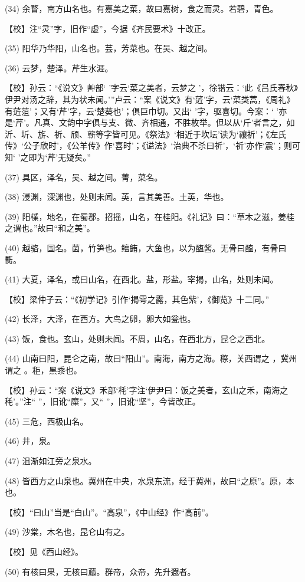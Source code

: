 \documentclass[12pt,UTF8]{ctexbook}
\begin{document}
(34) 余瞀，南方山名也。有嘉美之菜，故曰嘉树，食之而灵。若碧，青色。

【校】注“灵”字，旧作“虚”，今据《齐民要术》十改正。

(35) 阳华乃华阳，山名也。芸，芳菜也。在吴、越之间。

(36) 云梦，楚泽。芹生水涯。

【校】孙云：“《说文》艸部‘ ’字云‘菜之美者，云梦之 ’，徐锴云：‘此《吕氏春秋》伊尹对汤之辞，其为状未闻。’”卢云：“案《说文》有‘菦’字，云‘菜类蒿，《周礼》有菦菹’；又有‘芹’字，云‘楚葵也’；俱巨巾切。又出‘ ’字，驱喜切。今案：‘ ’亦是‘芹’。凡真、文韵中字俱与支、微、齐相通，不胜枚举。但以从‘斤’者言之，如沂、圻、旂、祈、颀、蕲等字皆可见。《祭法》‘相近于坎坛’读为‘禳祈’；《左氏传》‘公子欣时’，《公羊传》作‘喜时’；《谥法》‘治典不杀曰祈’，‘祈’亦作‘震’；则可知‘ ’之即为‘芹’无疑矣。”

(37) 具区，泽名，吴、越之间。菁，菜名。

(38) 浸渊，深渊也，处则未闻。英，言其美善。土英，华也。

(39) 阳檏，地名，在蜀郡。招摇，山名，在桂阳。《礼记》曰：“草木之滋，姜桂之谓也。”故曰“和之美”。

(40) 越骆，国名。菌，竹笋也。鳣鲔，大鱼也，以为醢酱。无骨曰醢，有骨曰臡。

(41) 大夏，泽名，或曰山名，在西北。盐，形盐。宰揭，山名，处则未闻。

【校】梁仲子云：“《初学记》引作‘揭雩之露，其色紫’，《御览》十二同。”

(42) 长泽，大泽，在西方。大鸟之卵，卵大如瓮也。

(43) 饭，食也。玄山，处则未闻。不周，山名，在西北方，昆仑之西北。

(44) 山南曰阳，昆仑之南，故曰“阳山”。南海，南方之海。穄，关西谓之 ，冀州谓之 。秬，黑黍也。

【校】孙云：“案《说文》禾部‘秏’字注‘伊尹曰：饭之美者，玄山之禾，南海之秏’。”注“ ”，旧讹“糜”，又“ ”，旧讹“坚”，今皆改正。

(45) 三危，西极山名。

(46) 井，泉。

(47) 沮渐如江旁之泉水。

(48) 皆西方之山泉也。冀州在中央，水泉东流，经于冀州，故曰“之原”。原，本也。

【校】“曰山”当是“白山”。“高泉”，《中山经》作“高前”。

(49) 沙棠，木名也，昆仑山有之。

【校】见《西山经》。

(50) 有核曰果，无核曰蓏。群帝，众帝，先升遐者。
\end{document}

